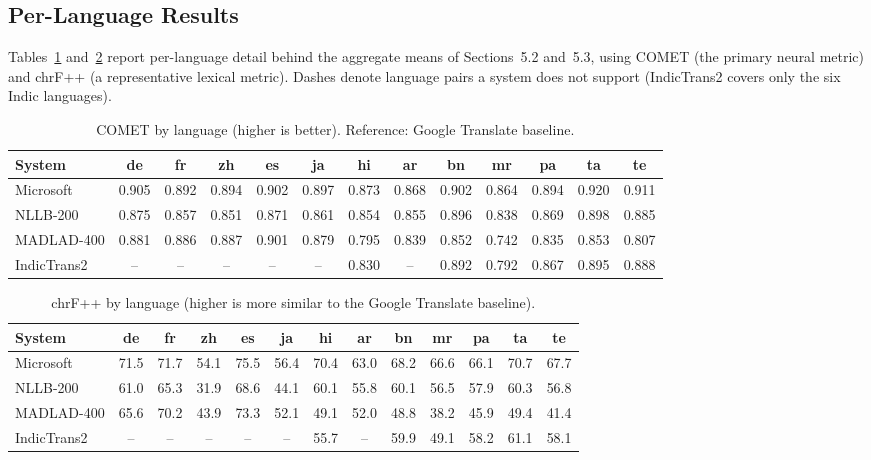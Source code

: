 \documentclass[Afour,sagev,times,doublespace]{sagej}
\begin{document}
\subsection{Per-Language Results}

Tables~\ref{tab:comet_lang} and~\ref{tab:chrf_lang} report per-language detail behind the aggregate means of Sections~5.2 and~5.3, using COMET (the primary neural metric) and chrF++ (a representative lexical metric). Dashes denote language pairs a system does not support (IndicTrans2 covers only the six Indic languages).

\begin{table}[t]
\small\sf\centering
\caption{COMET by language (higher is better). Reference: Google Translate baseline.\label{tab:comet_lang}}
\begin{tabular}{@{}lcccccccccccc@{}}
\toprule
System & de & fr & zh & es & ja & hi & ar & bn & mr & pa & ta & te \\
\midrule
Microsoft & 0.905 & 0.892 & 0.894 & 0.902 & 0.897 & 0.873 & 0.868 & 0.902 & 0.864 & 0.894 & 0.920 & 0.911 \\
NLLB-200 & 0.875 & 0.857 & 0.851 & 0.871 & 0.861 & 0.854 & 0.855 & 0.896 & 0.838 & 0.869 & 0.898 & 0.885 \\
MADLAD-400 & 0.881 & 0.886 & 0.887 & 0.901 & 0.879 & 0.795 & 0.839 & 0.852 & 0.742 & 0.835 & 0.853 & 0.807 \\
IndicTrans2 & -- & -- & -- & -- & -- & 0.830 & -- & 0.892 & 0.792 & 0.867 & 0.895 & 0.888 \\
\bottomrule
\end{tabular}
\end{table}

\begin{table}[t]
\small\sf\centering
\caption{chrF++ by language (higher is more similar to the Google Translate baseline).\label{tab:chrf_lang}}
\begin{tabular}{@{}lcccccccccccc@{}}
\toprule
System & de & fr & zh & es & ja & hi & ar & bn & mr & pa & ta & te \\
\midrule
Microsoft & 71.5 & 71.7 & 54.1 & 75.5 & 56.4 & 70.4 & 63.0 & 68.2 & 66.6 & 66.1 & 70.7 & 67.7 \\
NLLB-200 & 61.0 & 65.3 & 31.9 & 68.6 & 44.1 & 60.1 & 55.8 & 60.1 & 56.5 & 57.9 & 60.3 & 56.8 \\
MADLAD-400 & 65.6 & 70.2 & 43.9 & 73.3 & 52.1 & 49.1 & 52.0 & 48.8 & 38.2 & 45.9 & 49.4 & 41.4 \\
IndicTrans2 & -- & -- & -- & -- & -- & 55.7 & -- & 59.9 & 49.1 & 58.2 & 61.1 & 58.1 \\
\bottomrule
\end{tabular}
\end{table}
\end{document}
